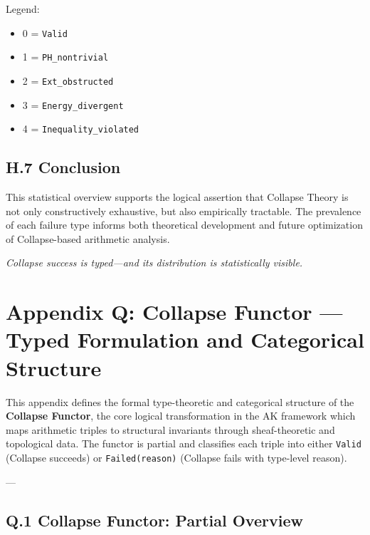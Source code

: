 \documentclass[11pt]{article}
\begin{document}
Legend:
\begin{itemize}
  \item 0 = \texttt{Valid}
  \item 1 = \texttt{PH\_nontrivial}
  \item 2 = \texttt{Ext\_obstructed}
  \item 3 = \texttt{Energy\_divergent}
  \item 4 = \texttt{Inequality\_violated}
\end{itemize}

\subsection*{H.7 Conclusion}

This statistical overview supports the logical assertion that Collapse Theory  
is not only constructively exhaustive, but also empirically tractable. The prevalence  
of each failure type informs both theoretical development and future optimization  
of Collapse-based arithmetic analysis.

\begin{center}
\textit{Collapse success is typed—and its distribution is statistically visible.}
\end{center}



\section*{Appendix Q: Collapse Functor — Typed Formulation and Categorical Structure}

This appendix defines the formal type-theoretic and categorical structure of the \textbf{Collapse Functor},  
the core logical transformation in the AK framework which maps arithmetic triples to structural invariants  
through sheaf-theoretic and topological data. The functor is partial and classifies each triple into either  
\texttt{Valid} (Collapse succeeds) or \texttt{Failed(reason)} (Collapse fails with type-level reason).

---

\subsection*{Q.1 Collapse Functor: Partial Overview}
\end{document}
